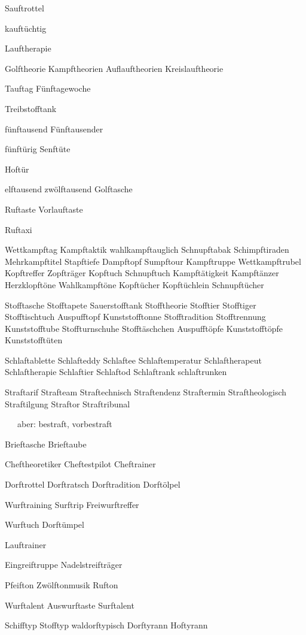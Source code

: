 Sauftrottel

kauftüchtig

Lauftherapie 

Golftheorie Kampftheorien Auflauftheorien Kreislauftheorie

Tauftag Fünftagewoche

Treibstofftank

fünftausend Fünftausender

fünftürig Senftüte

Hoftür

elftausend zwölftausend Golftasche

Ruftaste Vorlauftaste

Ruftaxi

Wettkampftag Kampftaktik 
wahlkampftauglich Schnupftabak
Schimpftiraden Mehrkampftitel Stapftiefe
Dampftopf Sumpftour
Kampftruppe Wettkampftrubel
Kopftreffer Zopfträger
Kopftuch Schnupftuch
Kampftätigkeit Kampftänzer
Herzklopftöne Wahlkampftöne
Kopftücher Kopftüchlein Schnupftücher

Stofftasche Stofftapete Sauerstofftank
Stofftheorie
Stofftier Stofftiger Stofftischtuch
Auspufftopf Kunststofftonne
Stofftradition Stofftrennung
Kunststofftube Stoffturnschuhe
Stofftäschchen
Auspufftöpfe Kunststofftöpfe
Kunststofftüten


Schlaftablette Schlafteddy Schlaftee Schlaftemperatur 
Schlaftherapeut Schlaftherapie Schlaftier Schlaftod 
Schlaftrank schlaftrunken

Straftarif Strafteam Straftechnisch Straftendenz
Straftermin Straftheologisch Straftilgung 
Straftor Straftribunal

\ \ \ aber: bestraft, vorbestraft

Brieftasche Brieftaube

Cheftheoretiker Cheftestpilot Cheftrainer

Dorftrottel Dorftratsch Dorftradition Dorftölpel

Wurftraining Surftrip Freiwurftreffer

Wurftuch Dorftümpel

Lauftrainer

Eingreiftruppe Nadelstreifträger

Pfeifton Zwölftonmusik Rufton

Wurftalent Auswurftaste Surftalent


Schifftyp Stofftyp waldorftypisch Dorftyrann Hoftyrann 


